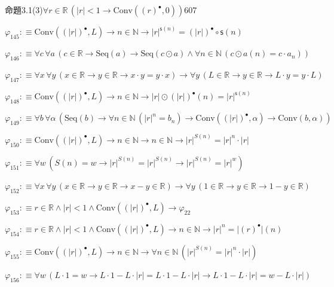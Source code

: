 \begin{fullproof}{命題3.1(3)}{$\forall r \in \mathbb{R}\,(\lvert r \rvert < 1 \to \mathrm{Conv}({(r)^{\bullet}},0))$}{607}
\begin{abbrevlist}
\item $\varphi_{145} :\equiv \mathrm{Conv}({(\lvert r \rvert)^{\bullet}},L) \to n \in \mathbb{N} \to {{\lvert r \rvert}^{\mathsf{s}(n)}} = {(\lvert r \rvert)^{\bullet}} \circ \mathsf{s}(n)$
\item $\varphi_{146} :\equiv \forall c\,\forall a\,(c \in \mathbb{R} \to \mathrm{Seq}(a) \to \mathrm{Seq}(c \odot a) \land \forall n \in \mathbb{N}\,(c \odot a(n) = c \cdot a_{n}))$
\item $\varphi_{147} :\equiv \forall x\,\forall y\,(x \in \mathbb{R} \to y \in \mathbb{R} \to x \cdot y = y \cdot x) \to \forall y\,(L \in \mathbb{R} \to y \in \mathbb{R} \to L \cdot y = y \cdot L)$
\item $\varphi_{148} :\equiv \mathrm{Conv}({(\lvert r \rvert)^{\bullet}},L) \to n \in \mathbb{N} \to \lvert r \rvert \odot {(\lvert r \rvert)^{\bullet}}(n) = {{\lvert r \rvert}^{\mathsf{s}(n)}}$
\item $\varphi_{149} :\equiv \forall b\,\forall \alpha\,(\mathrm{Seq}(b) \to \forall n \in \mathbb{N}\,({{\lvert r \rvert}^{n}} = b_{n}) \to \mathrm{Conv}({(\lvert r \rvert)^{\bullet}},\alpha) \to \mathrm{Conv}(b,\alpha))$
\item $\varphi_{150} :\equiv \mathrm{Conv}({(\lvert r \rvert)^{\bullet}},L) \to n \in \mathbb{N} \to n \in \mathbb{N} \to {{\lvert r \rvert}^{S(n)}} = {{\lvert r \rvert}^{n}} \cdot \lvert r \rvert$
\item $\varphi_{151} :\equiv \forall w\,(S(n) = w \to {{\lvert r \rvert}^{S(n)}} = {{\lvert r \rvert}^{S(n)}} \to {{\lvert r \rvert}^{S(n)}} = {{\lvert r \rvert}^{w}})$
\item $\varphi_{152} :\equiv \forall x\,\forall y\,(x \in \mathbb{R} \to y \in \mathbb{R} \to x - y \in \mathbb{R}) \to \forall y\,(1 \in \mathbb{R} \to y \in \mathbb{R} \to 1 - y \in \mathbb{R})$
\item $\varphi_{153} :\equiv r \in \mathbb{R} \land \lvert r \rvert < 1 \land \mathrm{Conv}({(\lvert r \rvert)^{\bullet}},L) \to \varphi_{22}$
\item $\varphi_{154} :\equiv r \in \mathbb{R} \land \lvert r \rvert < 1 \land \mathrm{Conv}({(\lvert r \rvert)^{\bullet}},L) \to n \in \mathbb{N} \to {{\lvert r \rvert}^{n}} = \lvert {(r)^{\bullet}} \rvert(n)$
\item $\varphi_{155} :\equiv \mathrm{Conv}({(\lvert r \rvert)^{\bullet}},L) \to n \in \mathbb{N} \to \forall n \in \mathbb{N}\,({{\lvert r \rvert}^{S(n)}} = {{\lvert r \rvert}^{n}} \cdot \lvert r \rvert)$
\item $\varphi_{156} :\equiv \forall w\,(L \cdot 1 = w \to L \cdot 1 - L \cdot \lvert r \rvert = L \cdot 1 - L \cdot \lvert r \rvert \to L \cdot 1 - L \cdot \lvert r \rvert = w - L \cdot \lvert r \rvert)$

\end{abbrevlist}
\end{fullproof}
